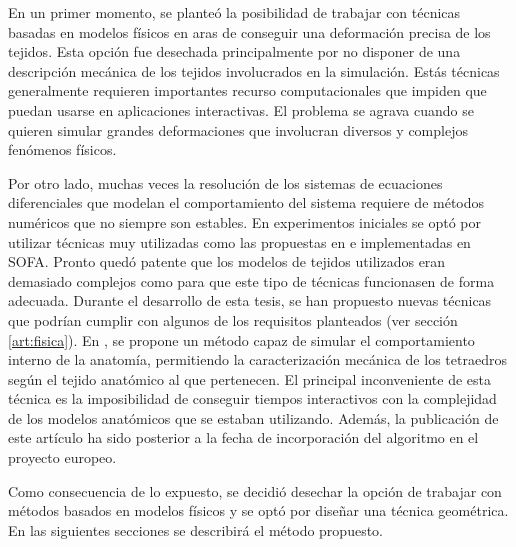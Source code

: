 En un primer momento, se planteó la posibilidad de trabajar con técnicas basadas en modelos físicos en aras de conseguir una deformación precisa de los tejidos. Esta opción fue desechada\new{,} principalmente por no disponer de una descripción mecánica de los tejidos involucrados en la simulación. Estás técnicas generalmente requieren importantes recurso computacionales que impiden que puedan usarse en aplicaciones interactivas. El problema se agrava cuando se quieren simular grandes deformaciones que involucran diversos y complejos fenómenos físicos.

Por otro lado, muchas veces la resolución de los sistemas de ecuaciones diferenciales que modelan el comportamiento del sistema requiere de métodos numéricos que no siempre son estables. En experimentos iniciales\new{,} se optó por utilizar técnicas muy utilizadas como las propuestas en  \cite{Muller2004} e implementadas en \ac{SOFA}. Pronto quedó patente que los modelos de tejidos utilizados eran demasiado complejos como para que este tipo de técnicas funcionasen de forma adecuada.
Durante el desarrollo de esta tesis, se han propuesto nuevas técnicas que podrían cumplir con algunos de los requisitos planteados (ver sección \ref{art:fisica}). En \cite{abu2015position}, se propone un método capaz de simular el comportamiento interno de la anatomía, permitiendo la caracterización mecánica de los tetraedros según el tejido anatómico al que pertenecen.  
El principal inconveniente de esta técnica es la imposibilidad de conseguir tiempos interactivos con la complejidad de los modelos anatómicos que se estaban utilizando. Además, la publicación de este artículo ha sido posterior a la fecha de incorporación del algoritmo en el proyecto europeo.

Como consecuencia de lo expuesto, se decidió desechar la opción de trabajar con métodos basados en modelos físicos y se optó por diseñar una técnica geométrica. En las siguientes secciones se describirá el método propuesto.